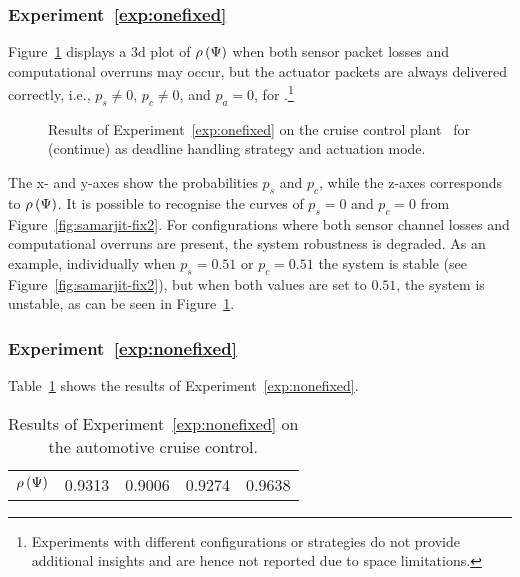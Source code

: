 \subsubsection*{Experiment~\ref{exp:onefixed}}%
Figure~\ref{fig:samarjit-sh-sc} displays a 3d plot of $\rho\left( \Psi \right)$ when both sensor packet losses and computational overruns may occur, but the actuator packets are always delivered correctly, i.e., $p_s \neq 0$, $p_c \neq 0$, and $p_a = 0$, for \tSH{}.\footnote{Experiments with different configurations or strategies do not provide additional insights and are hence not reported due to space limitations.}
%
\begin{figure}[t]
    \centering
    \caption{Results of Experiment~\ref{exp:onefixed} on the cruise control plant~\cite{Ghosh:2018} for (continue) \tSH{} as deadline handling strategy and actuation mode.}
    \label{fig:samarjit-sh-sc}
\end{figure}
%
The x- and y-axes show the probabilities $p_s$ and $p_c$, while the z-axes corresponds to $\rho\left( \Psi \right)$.
It is possible to recognise the curves of $p_s=0$ and $p_c=0$ from Figure~\ref{fig:samarjit-fix2}.
For configurations where both sensor channel losses and computational overruns are present, the system robustness is degraded.
As an example, individually when $p_s=0.51$ or $p_c=0.51$ the system is stable (see Figure~\ref{fig:samarjit-fix2}), but when both values are set to $0.51$, the system is unstable, as can be seen in Figure~\ref{fig:samarjit-sh-sc}.

\subsubsection*{Experiment~\ref{exp:nonefixed}}%
%
Table~\ref{tab:samarjit} shows the results of Experiment~\ref{exp:nonefixed}.
%
\begin{table}[h]
    \centering
    \def\arraystretch{1.25}
    \caption{Results of Experiment~\ref{exp:nonefixed} on the automotive cruise control.}
    \label{tab:samarjit}
    \begin{tabular}{c|cccc}
                            & \tKZ{} & \tKH{} & \tSZ{} & \tSH{} \\\hline\hline
        $\rho\left( \Psi \right)$  & 0.9313 & 0.9006 & 0.9274 & 0.9638
    \end{tabular}
\end{table}

